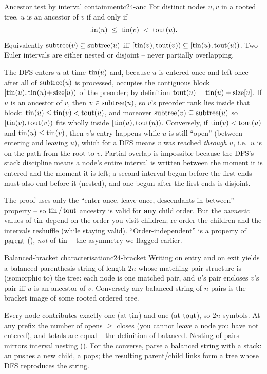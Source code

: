 \begin{theorem}{Ancestor test by interval containment}{c24-anc}
For distinct nodes $u, v$ in a rooted tree, $u$ is an ancestor of $v$ if and only if
\[
   \operatorname{tin}(u) \;\le\; \operatorname{tin}(v) \;<\; \operatorname{tout}(u).
\]
Equivalently $\operatorname{subtree}(v) \subseteq \operatorname{subtree}(u)$ iff $[\operatorname{tin}(v), \operatorname{tout}(v)) \subseteq
[\operatorname{tin}(u), \operatorname{tout}(u))$. Two Euler intervals are either nested or disjoint -- never partially
overlapping.
\end{theorem}
\begin{proofbox}
The DFS enters $u$ at time $\operatorname{tin}(u)$ and, because $u$ is entered once and left once after
all of $\operatorname{subtree}(u)$ is processed, occupies the contiguous block $[\operatorname{tin}(u), \operatorname{tin}(u){+}\operatorname{size}[u))$
of the preorder; by definition $\operatorname{tout}(u)=\operatorname{tin}(u)+\operatorname{size}[u]$. If $u$ is an ancestor of $v$,
then $v \in \operatorname{subtree}(u)$, so $v$'s preorder rank lies inside that block: $\operatorname{tin}(u) \le
\operatorname{tin}(v) < \operatorname{tout}(u)$, and moreover $\operatorname{subtree}(v) \subseteq \operatorname{subtree}(u)$ so
$[\operatorname{tin}(v),\operatorname{tout}(v))$ fits wholly inside $[\operatorname{tin}(u),\operatorname{tout}(u))$. Conversely, if $\operatorname{tin}(v) <
\operatorname{tout}(u)$ and $\operatorname{tin}(u) \le \operatorname{tin}(v)$, then $v$'s entry happens while $u$ is still ``open''
(between entering and leaving $u$), which for a DFS means $v$ was reached \emph{through}
$u$, i.e.\ $u$ is on the path from the root to $v$. Partial overlap is impossible because
the DFS's stack discipline means a node's entire interval is written between the moment it
is entered and the moment it is left; a second interval begun before the first ends must
also end before it (nested), and one begun after the first ends is disjoint.
\end{proofbox}
\begin{insightbox}
The proof uses only the ``enter once, leave once, descendants in between'' property -- so
$\operatorname{tin}/\operatorname{tout}$ ancestry is valid for \textbf{any} child order. But the \emph{numeric} values
of $\operatorname{tin}$ depend on the order you visit children; re-order the children and the intervals
reshuffle (while staying valid). ``Order-independent'' is a property of $\operatorname{parent}$
(), \emph{not} of $\operatorname{tin}$ -- the asymmetry we flagged earlier.
\end{insightbox}

\begin{proposition}{Balanced-bracket characterisation}{c24-bracket}
Writing \code{(} on entry and \code{)} on exit yields a balanced parenthesis string of
length $2n$ whose matching-pair structure is (isomorphic to) the tree: each node is one
matched pair, and $u$'s pair encloses $v$'s pair iff $u$ is an ancestor of $v$. Conversely
any balanced string of $n$ pairs is the bracket image of some rooted ordered tree.
\end{proposition}
\begin{proofbox}
Every node contributes exactly one \code{(} (at $\operatorname{tin}$) and one \code{)} (at $\operatorname{tout}$), so
$2n$ symbols. At any prefix the number of opens $\ge$ closes (you cannot leave a node you
have not entered), and totals are equal -- the definition of balanced. Nesting of pairs
mirrors interval nesting (). For the converse, parse a balanced string with
a stack: an \code{(} pushes a new child, a \code{)} pops; the resulting parent/child links
form a tree whose DFS reproduces the string.
\end{proofbox}

